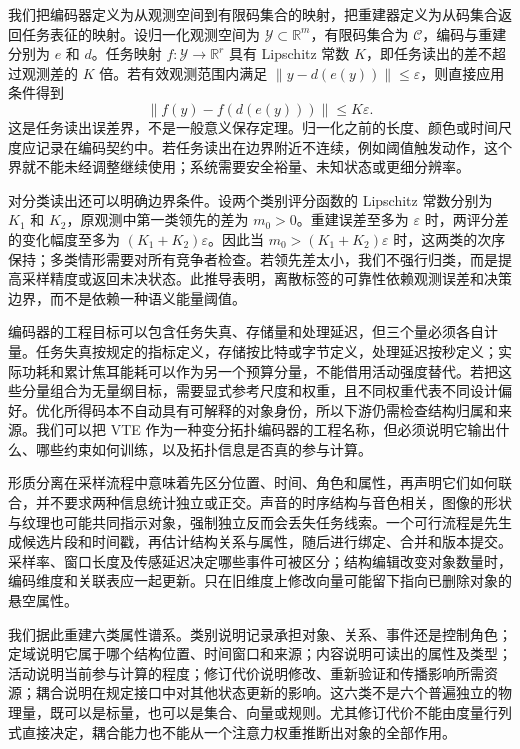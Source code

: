 我们把编码器定义为从观测空间到有限码集合的映射，把重建器定义为从码集合返回任务表征的映射。设归一化观测空间为 $\mathcal Y\subset\mathbb R^m$，有限码集合为 $\mathcal C$，编码与重建分别为 $e$ 和 $d$。任务映射 $f:\mathcal Y\to\mathbb R^r$ 具有 Lipschitz 常数 $K$，即任务读出的差不超过观测差的 $K$ 倍。若有效观测范围内满足 $\|y-d(e(y))\|\leq\varepsilon$，则直接应用条件得到
\[
 \|f(y)-f(d(e(y)))\|\leq K\varepsilon.
\]
这是任务读出误差界，不是一般意义保存定理。归一化之前的长度、颜色或时间尺度应记录在编码契约中。若任务读出在边界附近不连续，例如阈值触发动作，这个界就不能未经调整继续使用；系统需要安全裕量、未知状态或更细分辨率。

对分类读出还可以明确边界条件。设两个类别评分函数的 Lipschitz 常数分别为 $K_1$ 和 $K_2$，原观测中第一类领先的差为 $m_0>0$。重建误差至多为 $\varepsilon$ 时，两评分差的变化幅度至多为 $(K_1+K_2)\varepsilon$。因此当 $m_0>(K_1+K_2)\varepsilon$ 时，这两类的次序保持；多类情形需要对所有竞争者检查。若领先差太小，我们不强行归类，而是提高采样精度或返回未决状态。此推导表明，离散标签的可靠性依赖观测误差和决策边界，而不是依赖一种语义能量阈值。

编码器的工程目标可以包含任务失真、存储量和处理延迟，但三个量必须各自计量。任务失真按规定的指标定义，存储按比特或字节定义，处理延迟按秒定义；实际功耗和累计焦耳能耗可以作为另一个预算分量，不能借用活动强度替代。若把这些分量组合为无量纲目标，需要显式参考尺度和权重，且不同权重代表不同设计偏好。优化所得码本不自动具有可解释的对象身份，所以下游仍需检查结构归属和来源。我们可以把 VTE 作为一种变分拓扑编码器的工程名称，但必须说明它输出什么、哪些约束如何训练，以及拓扑信息是否真的参与计算。

形质分离在采样流程中意味着先区分位置、时间、角色和属性，再声明它们如何联合，并不要求两种信息统计独立或正交。声音的时序结构与音色相关，图像的形状与纹理也可能共同指示对象，强制独立反而会丢失任务线索。一个可行流程是先生成候选片段和时间戳，再估计结构关系与属性，随后进行绑定、合并和版本提交。采样率、窗口长度及传感延迟决定哪些事件可被区分；结构编辑改变对象数量时，编码维度和关联表应一起更新。只在旧维度上修改向量可能留下指向已删除对象的悬空属性。

我们据此重建六类属性谱系。类别说明记录承担对象、关系、事件还是控制角色；定域说明它属于哪个结构位置、时间窗口和来源；内容说明可读出的属性及类型；活动说明当前参与计算的程度；修订代价说明修改、重新验证和传播影响所需资源；耦合说明在规定接口中对其他状态更新的影响。这六类不是六个普遍独立的物理量，既可以是标量，也可以是集合、向量或规则。尤其修订代价不能由度量行列式直接决定，耦合能力也不能从一个注意力权重推断出对象的全部作用。

